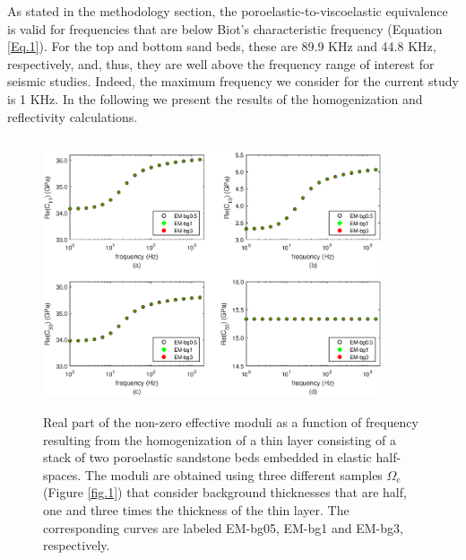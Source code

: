 \documentclass[draft]{agujournal2019}
\begin{document}
As stated in the methodology section, the poroelastic-to-viscoelastic equivalence is valid for frequencies that are below Biot's characteristic frequency (Equation \eqref{Eq.1}). For the top and bottom sand beds, these are 89.9 KHz and 44.8 KHz, respectively, and, thus, they are well above the frequency range of interest for seismic studies. Indeed, the maximum frequency we consider for the current study is 1 KHz. 
In the following we present the results of the homogenization and reflectivity calculations.
\begin{figure}[!ht]
\centering
        \includegraphics[width=100mm, height=80mm]{cijbg_2sandshale.eps}
\caption{Real part of the non-zero effective moduli as a function of frequency resulting from the homogenization of a thin layer consisting of a stack of two poroelastic sandstone beds embedded in elastic half-spaces. The moduli are obtained using three different samples $\Omega_e$ (Figure \ref{fig.1}) that consider background thicknesses that are half, one and three times the thickness of the thin layer. The corresponding curves are labeled EM-bg05, EM-bg1 and EM-bg3, respectively.}
\label{fig.2}
\end{figure}
\end{document}
